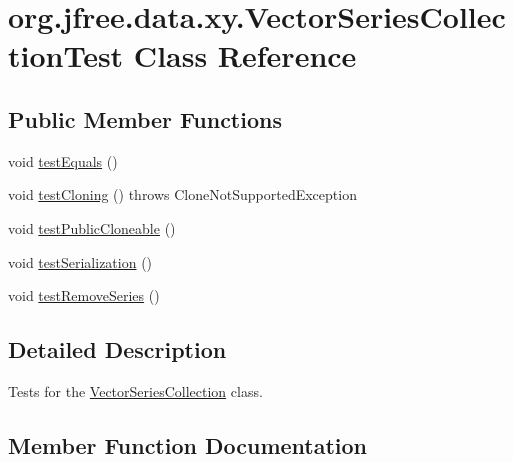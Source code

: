 \hypertarget{classorg_1_1jfree_1_1data_1_1xy_1_1_vector_series_collection_test}{}\section{org.\+jfree.\+data.\+xy.\+Vector\+Series\+Collection\+Test Class Reference}
\label{classorg_1_1jfree_1_1data_1_1xy_1_1_vector_series_collection_test}
\subsection*{Public Member Functions}
\begin{DoxyCompactItemize}
\item 
void \mbox{\hyperlink{classorg_1_1jfree_1_1data_1_1xy_1_1_vector_series_collection_test_a663df68f45d999b03691e3f200966a2a}{test\+Equals}} ()
\item 
void \mbox{\hyperlink{classorg_1_1jfree_1_1data_1_1xy_1_1_vector_series_collection_test_aee27c1a2d74d1b9de7da36af5ae4ca15}{test\+Cloning}} ()  throws Clone\+Not\+Supported\+Exception 
\item 
void \mbox{\hyperlink{classorg_1_1jfree_1_1data_1_1xy_1_1_vector_series_collection_test_a18363732c011bac21fc1c8954290b7b1}{test\+Public\+Cloneable}} ()
\item 
void \mbox{\hyperlink{classorg_1_1jfree_1_1data_1_1xy_1_1_vector_series_collection_test_a6315e1fc03cb75fcf51cf6aae0d725a3}{test\+Serialization}} ()
\item 
void \mbox{\hyperlink{classorg_1_1jfree_1_1data_1_1xy_1_1_vector_series_collection_test_ac120122258f8d7f3a463e346ddeda649}{test\+Remove\+Series}} ()
\end{DoxyCompactItemize}


\subsection{Detailed Description}
Tests for the \mbox{\hyperlink{classorg_1_1jfree_1_1data_1_1xy_1_1_vector_series_collection}{Vector\+Series\+Collection}} class. 

\subsection{Member Function Documentation}
\mbox{\label{classorg_1_1jfree_1_1data_1_1xy_1_1_vector_series_collection_test_aee27c1a2d74d1b9de7da36af5ae4ca15}} 
